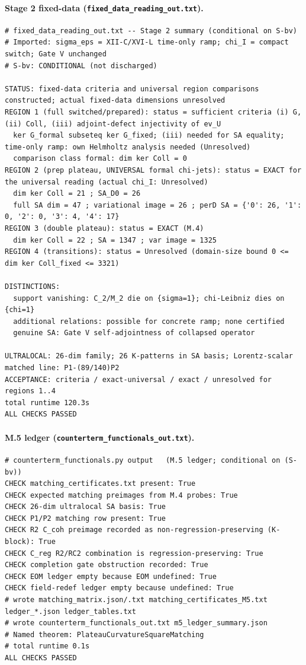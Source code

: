 \documentclass{article}
\theoremstyle{remark}
\begin{document}
\paragraph{Stage 2 fixed-data (\texttt{fixed\_data\_reading\_out.txt}).}
\begin{lstlisting}
# fixed_data_reading_out.txt -- Stage 2 summary (conditional on S-bv)
# Imported: sigma_eps = XII-C/XVI-L time-only ramp; chi_I = compact switch; Gate V unchanged
# S-bv: CONDITIONAL (not discharged)

STATUS: fixed-data criteria and universal region comparisons constructed; actual fixed-data dimensions unresolved
REGION 1 (full switched/prepared): status = sufficient criteria (i) G, (ii) Coll, (iii) adjoint-defect injectivity of ev_U
  ker G_formal subseteq ker G_fixed; (iii) needed for SA equality; time-only ramp: own Helmholtz analysis needed (Unresolved)
  comparison class formal: dim ker Coll = 0
REGION 2 (prep plateau, UNIVERSAL formal chi-jets): status = EXACT for the universal reading (actual chi_I: Unresolved)
  dim ker Coll = 21 ; SA_D0 = 26
  full SA dim = 47 ; variational image = 26 ; perD SA = {'0': 26, '1': 0, '2': 0, '3': 4, '4': 17}
REGION 3 (double plateau): status = EXACT (M.4)
  dim ker Coll = 22 ; SA = 1347 ; var image = 1325
REGION 4 (transitions): status = Unresolved (domain-size bound 0 <= dim ker Coll_fixed <= 3321)

DISTINCTIONS:
  support vanishing: C_2/M_2 die on {sigma=1}; chi-Leibniz dies on {chi=1}
  additional relations: possible for concrete ramp; none certified
  genuine SA: Gate V self-adjointness of collapsed operator

ULTRALOCAL: 26-dim family; 26 K-patterns in SA basis; Lorentz-scalar matched line: P1-(89/140)P2
ACCEPTANCE: criteria / exact-universal / exact / unresolved for regions 1..4
total runtime 120.3s
ALL CHECKS PASSED
\end{lstlisting}

\paragraph{M.5 ledger (\texttt{counterterm\_functionals\_out.txt}).}
\begin{lstlisting}
# counterterm_functionals.py output   (M.5 ledger; conditional on (S-bv))
CHECK matching_certificates.txt present: True
CHECK expected matching preimages from M.4 probes: True
CHECK 26-dim ultralocal SA basis: True
CHECK P1/P2 matching row present: True
CHECK R2 C_coh preimage recorded as non-regression-preserving (K-block): True
CHECK C_reg R2/RC2 combination is regression-preserving: True
CHECK completion gate obstruction recorded: True
CHECK EOM ledger empty because EOM undefined: True
CHECK field-redef ledger empty because undefined: True
# wrote matching_matrix.json/.txt matching_certificates_M5.txt ledger_*.json ledger_tables.txt
# wrote counterterm_functionals_out.txt m5_ledger_summary.json
# Named theorem: PlateauCurvatureSquareMatching
# total runtime 0.1s
ALL CHECKS PASSED
\end{lstlisting}
\end{document}
